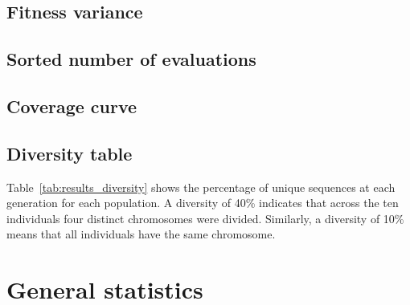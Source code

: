 \subsection{Fitness variance}
\subsection{Sorted number of evaluations}
\subsection{Coverage curve}
\subsection{Diversity table}
Table~\ref{tab:results_diversity} shows the percentage of unique sequences at
each generation for each population. A diversity of 40\% indicates that across
the ten individuals four distinct chromosomes were divided. Similarly, a
diversity of 10\% means that all individuals have the same chromosome.

\section{General statistics}
\label{sec:results_general}

